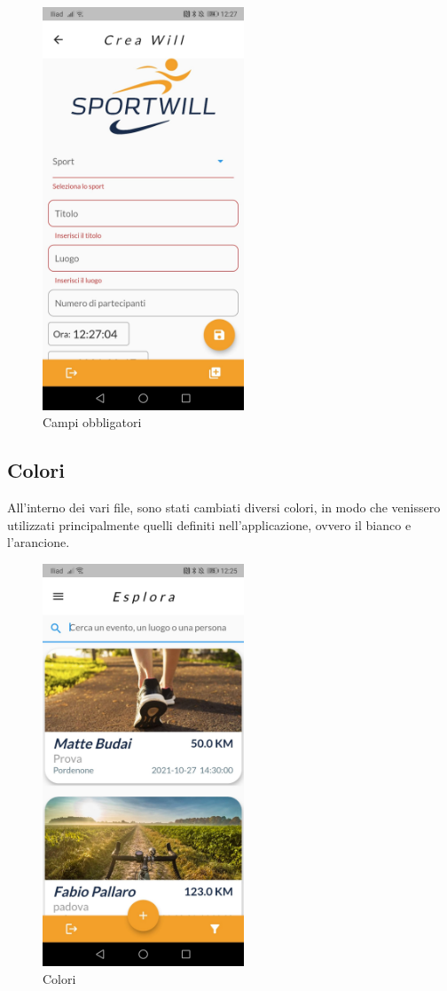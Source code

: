 \begin{figure}[htbp]	
	\centering
	\includegraphics[width=6cm]{immagini/modifica.jpeg}
	\caption{Campi obbligatori}
	\label{fig:Campi obbligatori}
\end{figure}

\newpage

\subsection{Colori}
All'interno dei vari file, sono stati cambiati diversi colori, in modo che venissero utilizzati principalmente quelli definiti nell'applicazione, ovvero il bianco e l'arancione.\\

\begin{figure}[htbp]	
	\centering
	\includegraphics[width=6cm]{immagini/colori.jpeg}
	\caption{Colori}
	\label{fig:Colori}
\end{figure}


